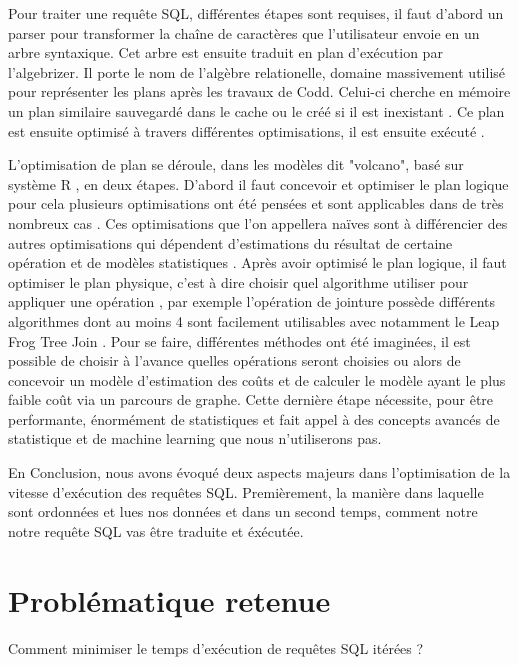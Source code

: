 \documentclass[12pt,a4paper]{article}
\begin{document}
Pour traiter une requête SQL, différentes étapes sont requises, il faut d'abord un parser pour transformer la chaîne de caractères que l'utilisateur envoie en un arbre syntaxique. Cet arbre est ensuite traduit en plan d'exécution par l'algebrizer. Il porte le nom de l'algèbre relationelle, domaine massivement utilisé pour représenter les plans après les travaux de Codd. Celui-ci cherche en mémoire un plan similaire sauvegardé dans le cache ou le créé si il est inexistant \cite[348]{ding_extensible_2024}. Ce plan est ensuite optimisé à travers différentes optimisations, il est ensuite exécuté \cite{Pierre_Senellart_Course} .

L'optimisation de plan se déroule, dans les modèles dit "volcano", basé sur système R \cite{astrahan_system_1976}, en deux étapes. D'abord il faut concevoir et optimiser le plan logique pour cela plusieurs optimisations ont été pensées et sont applicables dans de très nombreux cas \cite{abadi_design_2013}. Ces optimisations que l'on appellera naïves sont à différencier des autres optimisations qui dépendent d'estimations du résultat de certaine opération et de modèles statistiques \cite{lan_survey_2021}. Après avoir optimisé le plan logique, il faut optimiser le plan physique, c'est à dire choisir quel algorithme utiliser pour appliquer une opération \cite{abadi_design_2013}, par exemple l'opération de jointure possède différents algorithmes dont au moins 4 sont facilement utilisables avec notamment le Leap Frog Tree Join \cite{veldhuizen_leapfrog_2013}. Pour se faire, différentes méthodes ont été imaginées, il est possible de choisir à l'avance quelles opérations seront choisies ou alors de concevoir un modèle d'estimation des coûts et de calculer le modèle ayant le plus faible coût \cite{ding_extensible_2024,astrahan_system_1976} via un parcours de graphe. Cette dernière étape nécessite, pour être performante, énormément de statistiques et fait appel à des concepts avancés de statistique et de machine learning que nous n'utiliserons pas.


En Conclusion, nous avons évoqué deux aspects majeurs dans l'optimisation de la vitesse d'exécution des requêtes SQL. Premièrement, la manière dans laquelle sont ordonnées et lues nos données et dans un second temps, comment notre notre requête SQL vas être traduite et éxécutée.
\section*{Problématique retenue}
Comment minimiser le temps d'exécution de requêtes SQL itérées ?
\end{document}
